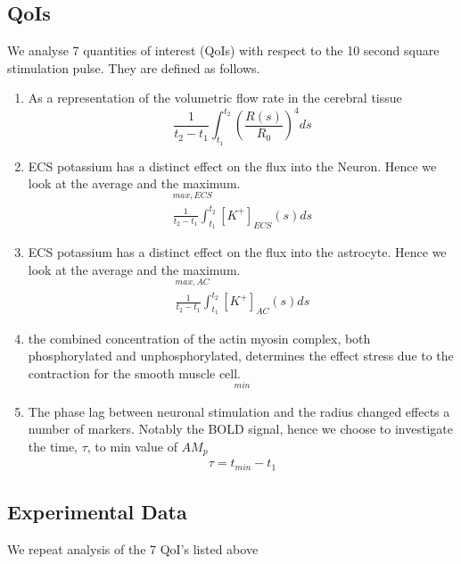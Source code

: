 \documentclass[12pt]{article}
\numberwithin{equation}{section}
\begin{document}
\subsection{QoIs}
We analyse 7 quantities of interest (QoIs) with respect to the 10 second square stimulation pulse. They are defined as follows.
\begin{enumerate}
\item As a representation of the volumetric flow rate in the cerebral tissue
\begin{equation}
\frac{1}{t_2-t_1}\int_{t_1}^{t_2}\left(\frac{R(s)}{R_0}\right)^4ds \label{vol_flow}
\end{equation}
 
\item ECS potassium has a distinct effect on the flux into the Neuron. Hence we look at the average and the maximum.
\begin{eqnarray}
[K^+]_{max,ECS} \label{K_ECS_Max} \\
 \frac{1}{t_2-t_1}\int_{t_1}^{t_2}[K^+]_{ECS}(s)ds \label{K_ECS_Mean}
\end{eqnarray}
\item ECS potassium has a distinct effect on the flux into the astrocyte. Hence we look at the average and the maximum.
\begin{eqnarray}
[K^+]_{max,AC} \label{K_AC_Max} \\
\frac{1}{t_2-t_1}\int_{t_1}^{t_2}[K^+]_{AC}(s)ds \label{K_AC_Mean}
\end{eqnarray}
\item the combined concentration of the actin myosin complex, both phosphorylated and unphosphorylated, determines the effect stress due to the contraction for the smooth muscle cell. 
\begin{eqnarray}
[AM+AM_p]_{min} \label{AM_AMp_Min}
\end{eqnarray}

\item The phase lag between neuronal stimulation and the radius changed effects a number of markers. Notably the BOLD signal, hence we choose to investigate
 the time, $\tau$, to min value of $AM_p$
 \begin{eqnarray}
 \tau = t_{min}-t_1 \label{AMp_Time_to_Min}
 \end{eqnarray}
\end{enumerate}

\subsection{Experimental Data}
We repeat analysis of the 7 QoI's listed above 
\end{document}
